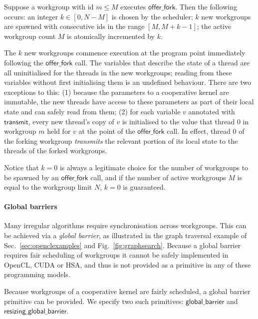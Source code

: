 \documentclass[numbers,nocopyrightspace,10pt]{sigplanconf}
\newcommand{\myfig}{Fig.~}
\newcommand{\mysec}{Sec.~}
\newcommand{\transmit}{\mathsf{transmit}}
\newcommand{\offerfork}{\mathsf{offer\_fork}}
\newcommand{\globalbarrier}{\mathsf{global\_barrier}}
\newcommand{\resizingglobalbarrier}{\mathsf{resizing\_global\_barrier}}
\begin{document}
Suppose a workgroup with id $m\leq M$ executes $\offerfork$.  Then the following occurs: an
integer $k \in [0, N-M]$ is chosen by the scheduler;
$k$ new workgroups are spawned with consecutive ids in the range $[M,
  M+k-1]$; the active workgroup count $M$ is atomically incremented by $k$.

The $k$ new workgroups commence execution at the program point
immediately following the $\offerfork$ call.  The variables that
describe the state of a thread are all uninitialised for the threads
in the new workgroups; reading from these variables without first
initialising them is an undefined behaviour.  There are two exceptions
to this: (1) because the parameters to a cooperative kernel are
immutable, the new threads have access to these parameters as part of
their local state and can safely read from them; (2) for each variable
$v$ annotated with $\transmit$, every new thread's copy of $v$ is
initialised to the value that thread 0 in workgroup $m$ held for $v$
at the point of the $\offerfork$ call.
%
In effect, thread 0 of the forking workgroup \emph{transmits} the relevant
portion of its local state to the threads of the forked workgroups.


Notice that $k=0$ is always a legitimate choice for the number of
workgroups to be spawned by an $\offerfork$ call, and if the number of
active workgroups $M$ is equal to the workgroup limit $N$, $k=0$ is
guaranteed.

\paragraph{Global barriers}

Many irregular algorithms require synchronisation across workgroups.
This can be achieved via a \emph{global barrier}, as illustrated in the graph traversal example of \mysec\ref{sec:openclexamples} and \myfig\ref{fig:graphsearch}.
Because a global barrier requires fair scheduling of workgroups it cannot be safely implemented in OpenCL, CUDA or HSA, and thus is not provided as a primitive in any of these programming models.

Because workgroups of a cooperative kernel are fairly scheduled, a
global barrier primitive can be provided.  We specify two such primitives: $\globalbarrier$
and $\resizingglobalbarrier$.
\end{document}
